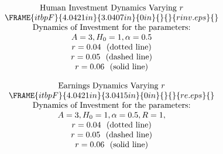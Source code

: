 \documentclass{article}
\numberwithin{equation}{section}
\begin{document}
\bigskip 
\begin{equation*}
\begin{tabular}{c}
$\text{Human Investment Dynamics Varying }r$ \\ 
$\FRAME{itbpF}{4.0421in}{3.0407in}{0in}{}{}{rinv.eps}{\special{language
"Scientific Word";type "GRAPHIC";maintain-aspect-ratio TRUE;display
"USEDEF";valid_file "F";width 4.0421in;height 3.0407in;depth
0in;original-width 5.8219in;original-height 4.3708in;cropleft "0";croptop
"1";cropright "1";cropbottom "0";filename 'rInv.eps';file-properties
"XNPEU";}}$ \\ 
$\text{Dynamics of Investment for the parameters:}$ \\ 
$A=3,H_{0}=1,\alpha =0.5$ \\ 
$r=0.04\text{ \ (dotted line)}$ \\ 
$r=0.05\text{ \ (dashed line)}$ \\ 
$r=0.06\text{ \ (solid line)}$%
\end{tabular}%
\bigskip
\end{equation*}

\pagebreak

\bigskip 
\begin{equation*}
\begin{tabular}{c}
Earnings$\text{ Dynamics Varying }r$ \\ 
$\FRAME{itbpF}{4.0421in}{3.0415in}{0in}{}{}{re.eps}{\special{language
"Scientific Word";type "GRAPHIC";maintain-aspect-ratio TRUE;display
"USEDEF";valid_file "F";width 4.0421in;height 3.0415in;depth
0in;original-width 5.8219in;original-height 4.3708in;cropleft "0";croptop
"1";cropright "1";cropbottom "0";filename 'rE.eps';file-properties "XNPEU";}}
$ \\ 
$\text{Dynamics of Investment for the parameters:}$ \\ 
$A=3,H_{0}=1,\alpha =0.5,R=1,$ \\ 
$r=0.04\text{ \ (dotted line)}$ \\ 
$r=0.05\text{ \ (dashed line)}$ \\ 
$r=0.06\text{ \ (solid line)}$%
\end{tabular}%
\bigskip
\end{equation*}
\end{document}
